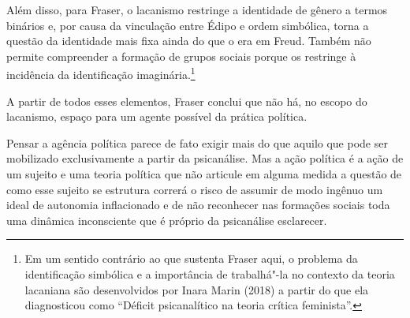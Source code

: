 Além disso, para Fraser, o lacanismo restringe a identidade de gênero a
termos binários e, por causa da vinculação entre Édipo e ordem
simbólica, torna a questão da identidade mais fixa ainda do que o era em
Freud. Também não permite compreender a formação de grupos sociais
porque os restringe à incidência da identificação imaginária.\footnote{Em
  um sentido contrário ao que sustenta Fraser aqui, o problema da
  identificação simbólica e a importância de trabalhá"-la no contexto da
  teoria lacaniana são desenvolvidos por Inara Marin (2018) a partir do
  que ela diagnosticou como ``Déficit psicanalítico na teoria crítica
  feminista''.}

A partir de todos esses elementos, Fraser conclui que não há, no escopo
do lacanismo, espaço para um agente possível da prática política.

Pensar a agência política parece de fato exigir mais do que aquilo que
pode ser mobilizado exclusivamente a partir da psicanálise. Mas a ação
política é a ação de um sujeito e uma teoria política que não articule
em alguma medida a questão de como esse sujeito se estrutura correrá o
risco de assumir de modo ingênuo um ideal de autonomia inflacionado e de
não reconhecer nas formações sociais toda uma dinâmica inconsciente que
é próprio da psicanálise esclarecer.

